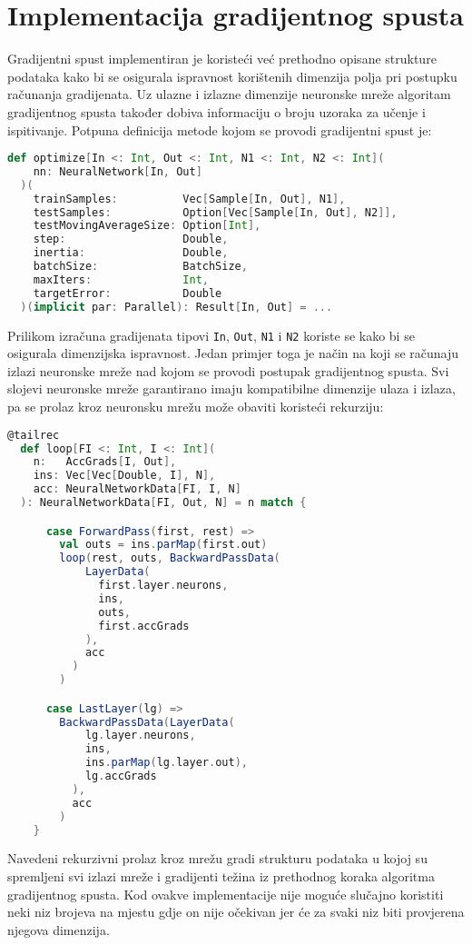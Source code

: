 \section*{Implementacija gradijentnog spusta}
Gradijentni spust implementiran je koristeći već prethodno opisane strukture podataka kako bi se osigurala ispravnost
korištenih dimenzija polja pri postupku računanja gradijenata. Uz ulazne i izlazne dimenzije neuronske mreže algoritam
gradijentnog spusta također dobiva informaciju o broju uzoraka za učenje i ispitivanje. Potpuna definicija metode kojom
se provodi gradijentni spust je:
\tiny
\begin{lstlisting}[language=scala,label={lst:lstlisting8}]
  def optimize[In <: Int, Out <: Int, N1 <: Int, N2 <: Int](
    nn: NeuralNetwork[In, Out]
  )(
    trainSamples:          Vec[Sample[In, Out], N1],
    testSamples:           Option[Vec[Sample[In, Out], N2]],
    testMovingAverageSize: Option[Int],
    step:                  Double,
    inertia:               Double,
    batchSize:             BatchSize,
    maxIters:              Int,
    targetError:           Double
  )(implicit par: Parallel): Result[In, Out] = ...
\end{lstlisting}
\normalsize
Prilikom izračuna gradijenata tipovi \texttt{In}, \texttt{Out}, \texttt{N1} i \texttt{N2} koriste se kako bi se
osigurala dimenzijska ispravnost. Jedan primjer toga je način na koji se računaju izlazi neuronske mreže nad kojom se
provodi postupak gradijentnog spusta. Svi slojevi neuronske mreže garantirano imaju kompatibilne dimenzije ulaza i
izlaza, pa se prolaz kroz neuronsku mrežu može obaviti koristeći rekurziju:
\tiny
\begin{lstlisting}[language=scala,label={lst:lstlisting9}]
  @tailrec
  def loop[FI <: Int, I <: Int](
    n:   AccGrads[I, Out],
    ins: Vec[Vec[Double, I], N],
    acc: NeuralNetworkData[FI, I, N]
  ): NeuralNetworkData[FI, Out, N] = n match {

      case ForwardPass(first, rest) =>
        val outs = ins.parMap(first.out)
        loop(rest, outs, BackwardPassData(
            LayerData(
              first.layer.neurons,
              ins,
              outs,
              first.accGrads
            ),
            acc
          )
        )

      case LastLayer(lg) =>
        BackwardPassData(LayerData(
            lg.layer.neurons,
            ins,
            ins.parMap(lg.layer.out),
            lg.accGrads
          ),
          acc
        )
    }
\end{lstlisting}
\normalsize
Navedeni rekurzivni prolaz kroz mrežu gradi strukturu podataka u kojoj su spremljeni svi izlazi mreže i gradijenti
težina iz prethodnog koraka algoritma gradijentnog spusta. Kod ovakve implementacije nije moguće slučajno koristiti neki
niz brojeva na mjestu gdje on nije očekivan jer će za svaki niz biti provjerena njegova dimenzija.
